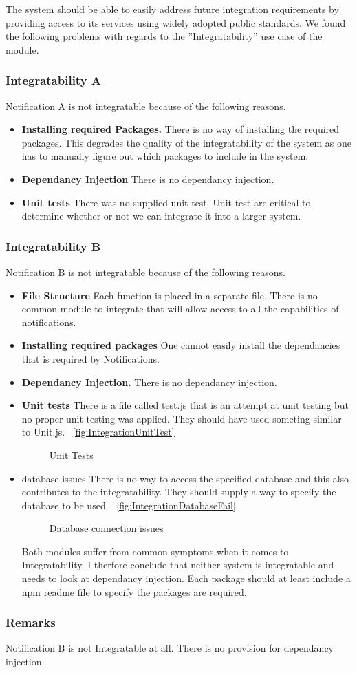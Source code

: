 The system should be able to easily address future integration requirements by providing access to its services using widely adopted public standards.
We found the following problems with regards to the ''Integratability'' use case of the module.
\subsubsection*{Integratability A}
Notification A is not integratable because of the following reasons.
\begin{itemize}
	\item \textbf{Installing required Packages.}
	There is no way of installing the required packages. This degrades the quality of the integratability of the system as one has to manually figure out which packages to include in the system.
	\item \textbf{Dependancy Injection}
	There is no dependancy injection.
	\item \textbf{Unit tests}
	There was no supplied unit test. Unit test are critical to determine whether or not we can integrate it into a larger system.
\end{itemize}
\subsubsection*{Integratability B}
Notification B is not integratable because of the following reasons.
\begin{itemize}
	\item \textbf{File Structure} 
	Each function is placed in a separate file. There is no common module to integrate that will allow access to all the capabilities of notifications.
	\item \textbf{Installing required packages}
	One cannot easily install the dependancies that is required by Notifications.
	\item \textbf{Dependancy Injection.}
	There is no dependancy injection.
	\item \textbf{Unit tests} There is a file called test.js that is an attempt at unit testing but no proper unit testing was applied. They should have used someting similar to Unit.js.
		~\ref{fig:IntegrationUnitTest}
		\begin{figure}[H]
			\centering
			\caption{Unit Tests}
			\label{fig:scope}
		\end{figure}
	\item database issues
	There is no way to access the specified database and this also contributes to the integratability. They should supply a way to specify the database to be used.
		~\ref{fig:IntegrationDatabaseFail}
		\begin{figure}[H]
			\centering
			\caption{Database connection issues}
			\label{fig:scope}
		\end{figure}
Both modules suffer from common symptoms when it comes to Integratability. I therfore conclude that neither system is integratable and needs to look at dependancy injection. Each package should at least include a npm readme file to specify the packages are required.
\end{itemize}
\subsubsection*{Remarks}
Notification B is not Integratable at all. There is no provision for dependancy injection.